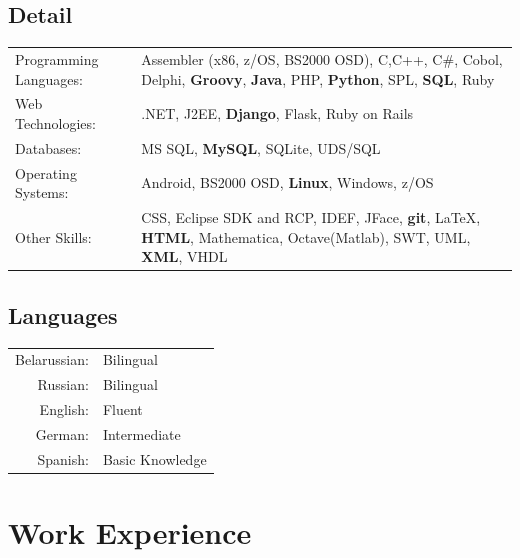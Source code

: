 \documentclass[a4paper,12pt]{article}
\begin{document}
\subsection{Detail}
\hspace{0.75cm}
\begin{tabular}{lp{10cm}}
    Programming Languages:& \small Assembler (x86, z/OS, BS2000 OSD), C,C++, C\#, Cobol, Delphi, \textbf{Groovy}, \textbf{Java}, PHP, \textbf{Python}, SPL, \textbf{SQL}, Ruby \\ 
    Web Technologies:&\small .NET, J2EE, \textbf{Django}, Flask, Ruby on Rails\\ 
    Databases:&\small MS SQL, \textbf{MySQL}, SQLite, UDS/SQL\\ 
    Operating Systems:&\small Android, BS2000 OSD, \textbf{Linux}, Windows, z/OS\\ 
    Other Skills:&\small CSS, Eclipse SDK and RCP, IDEF, JFace, \textbf{git}, \LaTeX, \textbf{HTML}, Mathematica, Octave(Matlab), SWT, UML, \textbf{XML}, VHDL\\ 
\end{tabular} 

\subsection{Languages}
\hspace{0.75cm}
\begin{tabular}{rl}
    Belarussian: & Bilingual\\
    Russian: & Bilingual\\
    English: & Fluent\\
    German: & Intermediate\\
    Spanish: & Basic Knowledge\\
\end{tabular}
\newpage

\section{Work Experience}
\end{document}

